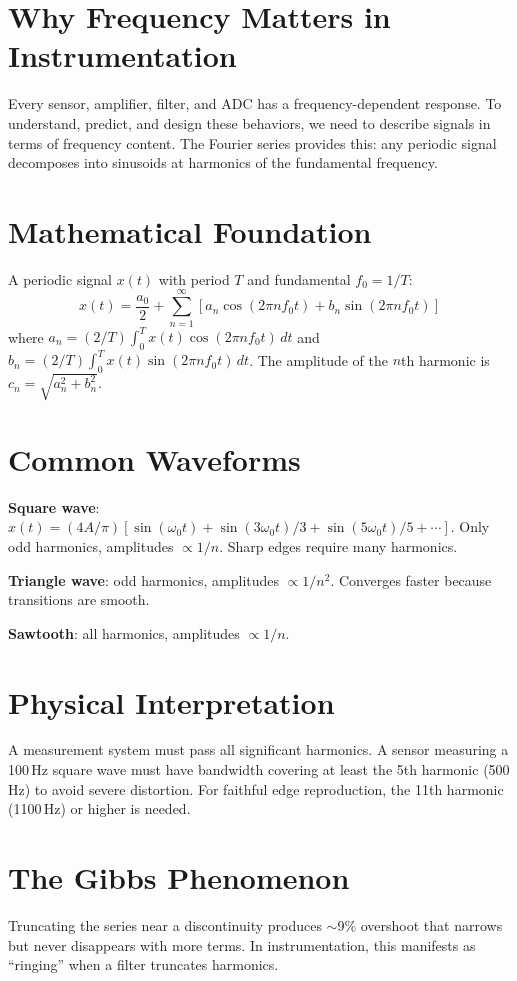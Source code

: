 \documentclass[11pt,letterpaper,twoside,openany]{book}
\begin{document}
\section{Why Frequency Matters in Instrumentation}
Every sensor, amplifier, filter, and ADC has a frequency-dependent response. To understand, predict, and design these behaviors, we need to describe signals in terms of frequency content. The Fourier series provides this: any periodic signal decomposes into sinusoids at harmonics of the fundamental frequency.

\section{Mathematical Foundation}
A periodic signal $x(t)$ with period $T$ and fundamental $f_0 = 1/T$:
\begin{equation}
x(t) = \frac{a_0}{2} + \sum_{n=1}^{\infty}\left[a_n\cos(2\pi n f_0 t) + b_n\sin(2\pi n f_0 t)\right]
\end{equation}
where $a_n = (2/T)\int_0^T x(t)\cos(2\pi n f_0 t)\,dt$ and $b_n = (2/T)\int_0^T x(t)\sin(2\pi n f_0 t)\,dt$. The amplitude of the $n$th harmonic is $c_n = \sqrt{a_n^2 + b_n^2}$.

\section{Common Waveforms}
\textbf{Square wave}: $x(t) = (4A/\pi)[\sin(\omega_0 t) + \sin(3\omega_0 t)/3 + \sin(5\omega_0 t)/5 + \cdots]$. Only odd harmonics, amplitudes $\propto 1/n$. Sharp edges require many harmonics.

\textbf{Triangle wave}: odd harmonics, amplitudes $\propto 1/n^2$. Converges faster because transitions are smooth.

\textbf{Sawtooth}: all harmonics, amplitudes $\propto 1/n$.

\section{Physical Interpretation}
A measurement system must pass all significant harmonics. A sensor measuring a 100\,Hz square wave must have bandwidth covering at least the 5th harmonic (500\,Hz) to avoid severe distortion. For faithful edge reproduction, the 11th harmonic (1100\,Hz) or higher is needed.

\section{The Gibbs Phenomenon}
Truncating the series near a discontinuity produces $\sim$9\% overshoot that narrows but never disappears with more terms. In instrumentation, this manifests as ``ringing'' when a filter truncates harmonics.
\end{document}
